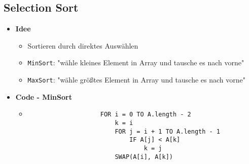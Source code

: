 \subsection{Selection Sort}
    \begin{itemize}
        \item \textbf{Idee}
            \begin{itemize}
                \item Sortieren durch direktes Auswählen
                \item \texttt{MinSort}: "wähle kleines Element in Array und tausche es nach vorne" 
                \item \texttt{MaxSort}: "wähle größtes Element in Array und tausche es nach vorne" 
            \end{itemize}

        \item \textbf{Code - MinSort}
            \begin{itemize}
                \item[]
                    \begin{verbatim}
                    FOR i = 0 TO A.length - 2
                        k = i 
                        FOR j = i + 1 TO A.length - 1
                            IF A[j] < A[k]
                                k = j 
                        SWAP(A[i], A[k])
                    \end{verbatim}
            \end{itemize}
    \end{itemize}

\pagebreak

